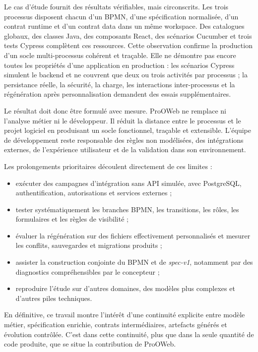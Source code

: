 Le cas d'étude fournit des résultats vérifiables, mais circonscrits. Les trois
processus disposent chacun d'un BPMN, d'une spécification normalisée, d'un
contrat runtime et d'un contrat data dans un même workspace. Des catalogues
globaux, des classes Java, des composants React, des scénarios Cucumber et trois
tests Cypress complètent ces ressources. Cette observation confirme la
production d'un socle multi-processus cohérent et traçable. Elle ne démontre pas
encore toutes les propriétés d'une application en production : les scénarios
Cypress simulent le backend et ne couvrent que deux ou trois activités par
processus ; la persistance réelle, la sécurité, la charge, les interactions
inter-processus et la régénération après personnalisation demandent des essais
supplémentaires.

Le résultat doit donc être formulé avec mesure. ProOWeb ne remplace ni l'analyse
métier ni le développeur. Il réduit la distance entre le processus et le projet
logiciel en produisant un socle fonctionnel, traçable et extensible. L'équipe de
développement reste responsable des règles non modélisées, des intégrations
externes, de l'expérience utilisateur et de la validation dans son environnement.


Les prolongements prioritaires découlent directement de ces limites :
\begin{itemize}
    \item exécuter des campagnes d'intégration sans API simulée, avec PostgreSQL, authentification, autorisations et services externes ;
    \item tester systématiquement les branches BPMN, les transitions, les rôles, les formulaires et les règles de visibilité ;
    \item évaluer la régénération sur des fichiers effectivement personnalisés et mesurer les conflits, sauvegardes et migrations produits ;
    \item assister la construction conjointe du BPMN et de \textit{spec-v1}, notamment par des diagnostics compréhensibles par le concepteur ;
    \item reproduire l'étude sur d'autres domaines, des modèles plus complexes et d'autres piles techniques.
\end{itemize}

En définitive, ce travail montre l'intérêt d'une continuité explicite entre
modèle métier, spécification enrichie, contrats intermédiaires, artefacts
générés et évolution contrôlée. C'est dans cette continuité, plus que dans la
seule quantité de code produite, que se situe la contribution de ProOWeb.

\myCleanStarChapterEnd
